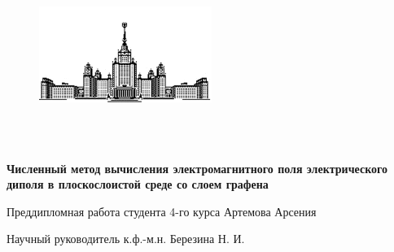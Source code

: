


	\newpage
	
	\begin{figure}[h] %
		\centering %
		\includegraphics[width=0.5\textwidth]{МГУ.PNG} %
		
	\end{figure}
	
	\begin{center}
		 \\
		
		 \\
		
		
		
	\end{center}
	
	
	
	\vspace{5em}
	
	\begin{center}
		\textbf{\LARGE{Численный метод вычисления электромагнитного поля электрического диполя
				в плоскослоистой среде со слоем графена}}
	\end{center}
	
	\vspace{2em}
	
	\begin{center}
		\large{Преддипломная работа студента 4-го курса Артемова Арсения}
	\end{center}
	
	\vspace{6em}
	
	\begin{flushright}
		
		\large{	Научный руководитель \linebreak
			к.ф.-м.н. Березина Н. И.}\\
		\vspace{3em}
		
		
	\end{flushright}
	

